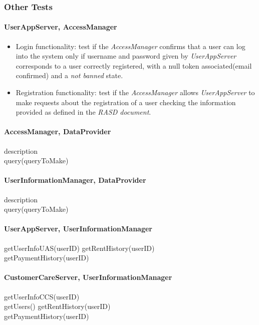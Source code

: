 \subsubsection{Other Tests}

\paragraph{UserAppServer, AccessManager}
\begin{itemize}
\item Login functionality: test if the \emph{AccessManager} confirms that a user can log into the system only if username and password given by \emph{UserAppServer} corresponds to a user correctly registered, with a null token associated(email confirmed) and a \emph{not banned} state.
\item Registration functionality: test if the \emph{AccessManager} allows \emph{UserAppServer} to make requests about the registration of a user checking the information provided as defined in the \emph{RASD document}\cite{RASD}.
\end{itemize}



\paragraph{AccessManager, DataProvider} 
description \\
query(queryToMake)

\paragraph{UserInformationManager, DataProvider} 
description \\
query(queryToMake)

\paragraph{UserAppServer, UserInformationManager}
getUserInfoUAS(userID)
getRentHistory(userID) \\
getPaymentHistory(userID) \\

\paragraph{CustomerCareServer, UserInformationManager}
getUserInfoCCS(userID) \\
getUsers()
getRentHistory(userID) \\
getPaymentHistory(userID) \\










